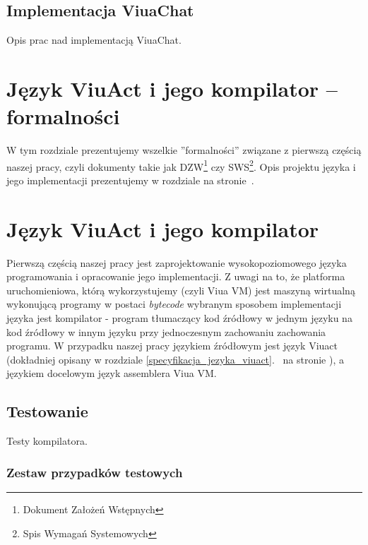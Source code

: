 \documentclass[11pt,oneside,a4paper,titlepage,onecolumn]{book}
\begin{document}
\section{Implementacja ViuaChat}

Opis prac nad implementacją ViuaChat.

\chapter{Język ViuAct i jego kompilator -- formalności}

W tym rozdziale prezentujemy wszelkie ''formalności'' związane z pierwszą częścią naszej pracy, czyli
dokumenty takie jak DZW\footnote{Dokument Założeń Wstępnych} czy SWS\footnote{Spis Wymagań Systemowych}.
Opis projektu języka i jego implementacji prezentujemy w rozdziale  na
stronie~\pageref{jezyk_viuact_i_jego_kompilator}.





\chapter{Język ViuAct i jego kompilator}
\label{jezyk_viuact_i_jego_kompilator}

Pierwszą częścią naszej pracy jest zaprojektowanie wysokopoziomowego języka programowania i opracowanie jego
implementacji. Z uwagi na to, że platforma uruchomieniowa, którą wykorzystujemy (czyli Viua VM) jest maszyną
wirtualną wykonującą programy w postaci \emph{bytecode} wybranym sposobem implementacji języka jest
kompilator - program tłumaczący kod źródłowy w jednym języku na kod źródłowy w innym języku przy jednoczesnym
zachowaniu zachowania programu. W przypadku naszej pracy językiem źródłowym jest język Viuact (dokładniej
opisany w rozdziale \ref{specyfikacja_jezyka_viuact}.~ na stronie
\pageref{specyfikacja_jezyka_viuact}), a językiem docelowym język assemblera Viua VM.





\section{Testowanie}

Testy kompilatora.

\subsection{Zestaw przypadków testowych}
\end{document}
